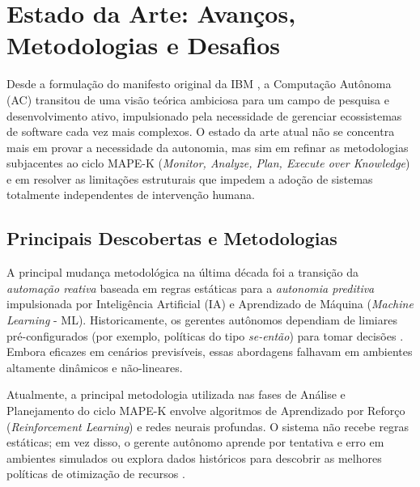 \section{Estado da Arte: Avanços, Metodologias e Desafios}

Desde a formulação do manifesto original da IBM \cite{ibm2001}, a Computação Autônoma (AC) transitou de uma visão teórica ambiciosa para um campo de pesquisa e desenvolvimento ativo, impulsionado pela necessidade de gerenciar ecossistemas de software cada vez mais complexos. O estado da arte atual não se concentra mais em provar a necessidade da autonomia, mas sim em refinar as metodologias subjacentes ao ciclo MAPE-K (\textit{Monitor, Analyze, Plan, Execute over Knowledge}) e em resolver as limitações estruturais que impedem a adoção de sistemas totalmente independentes de intervenção humana.

\subsection{Principais Descobertas e Metodologias}

A principal mudança metodológica na última década foi a transição da \textit{automação reativa} baseada em regras estáticas para a \textit{autonomia preditiva} impulsionada por Inteligência Artificial (IA) e Aprendizado de Máquina (\textit{Machine Learning} - ML). Historicamente, os gerentes autônomos dependiam de limiares pré-configurados (por exemplo, políticas do tipo \textit{se-então}) para tomar decisões \cite{correa2007}. Embora eficazes em cenários previsíveis, essas abordagens falhavam em ambientes altamente dinâmicos e não-lineares.

Atualmente, a principal metodologia utilizada nas fases de Análise e Planejamento do ciclo MAPE-K envolve algoritmos de Aprendizado por Reforço (\textit{Reinforcement Learning}) e redes neurais profundas. O sistema não recebe regras estáticas; em vez disso, o gerente autônomo aprende por tentativa e erro em ambientes simulados ou explora dados históricos para descobrir as melhores políticas de otimização de recursos \cite{lalanda2013}. 

